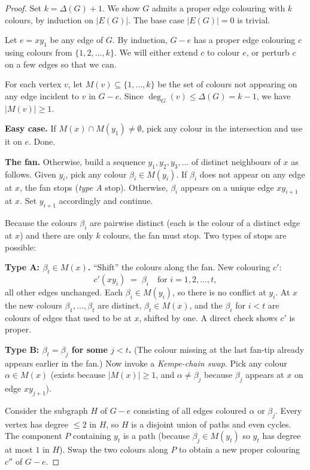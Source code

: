 \documentclass[11pt]{article}
\begin{document}
\begin{proof}
Set $k = \Delta(G) + 1$. We show $G$ admits a proper edge colouring
with $k$ colours, by induction on $|E(G)|$. The base case
$|E(G)| = 0$ is trivial.

Let $e = xy_1$ be any edge of $G$. By induction, $G - e$ has a proper
edge colouring $c$ using colours from $\{1, 2, \dots, k\}$. We will
either extend $c$ to colour $e$, or perturb $c$ on a few edges so
that we can.

For each vertex $v$, let $M(v) \subseteq \{1,\dots,k\}$ be the set of
colours not appearing on any edge incident to $v$ in $G - e$. Since
$\deg_G(v) \leq \Delta(G) = k - 1$, we have $|M(v)| \geq 1$.

\textbf{Easy case.} If $M(x) \cap M(y_1) \neq \emptyset$, pick any
colour in the intersection and use it on $e$. Done.

\textbf{The fan.} Otherwise, build a sequence $y_1, y_2, y_3, \dots$
of distinct neighbours of $x$ as follows. Given $y_i$, pick any
colour $\beta_i \in M(y_i)$. If $\beta_i$ does not appear on any
edge at $x$, the fan stops (\emph{type A} stop). Otherwise, $\beta_i$
appears on a unique edge $x y_{i+1}$ at $x$. Set $y_{i+1}$ accordingly
and continue.

Because the colours $\beta_i$ are pairwise distinct (each is the
colour of a distinct edge at $x$) and there are only $k$ colours,
the fan must stop. Two types of stops are possible:

\textbf{Type A: $\beta_t \in M(x)$.} ``Shift'' the colours along the
fan. New colouring $c'$:
\[
c'(x y_i) \;=\; \beta_i \quad \text{for } i = 1, 2, \dots, t,
\]
all other edges unchanged. Each $\beta_i \in M(y_i)$, so there is
no conflict at $y_i$. At $x$ the new colours
$\beta_1, \dots, \beta_t$ are distinct, $\beta_t \in M(x)$, and the
$\beta_i$ for $i < t$ are colours of edges that used to be at $x$,
shifted by one. A direct check shows $c'$ is proper.

\textbf{Type B: $\beta_t = \beta_j$ for some $j < t$.} (The colour
missing at the last fan-tip already appears earlier in the fan.) Now
invoke a \emph{Kempe-chain swap}. Pick any colour $\alpha \in M(x)$
(exists because $|M(x)| \geq 1$, and $\alpha \neq \beta_j$ because
$\beta_j$ appears at $x$ on edge $xy_{j+1}$).

Consider the subgraph $H$ of $G - e$ consisting of all edges
coloured $\alpha$ or $\beta_j$. Every vertex has degree $\leq 2$ in
$H$, so $H$ is a disjoint union of paths and even cycles. The
component $P$ containing $y_t$ is a path (because $\beta_j \in
M(y_t)$ so $y_t$ has degree at most $1$ in $H$). Swap the two
colours along $P$ to obtain a new proper colouring $c''$ of $G - e$.


\end{proof}
\end{document}
